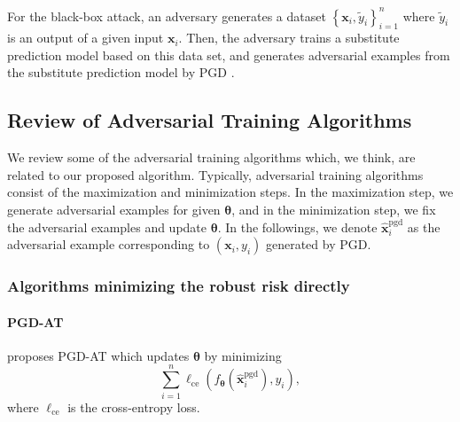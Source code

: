 \documentclass[nohyperref]{article}
\theoremstyle{plain}
\theoremstyle{definition}
\theoremstyle{remark}
\begin{document}


For the black-box attack, an adversary generates a dataset $\left\{\bm{x}_i, \tilde{y}_i \right\}_{i=1}^n$ where $\tilde{y}_i$ is an output of a given input $\bm{x}_i$.
Then, the adversary trains a substitute prediction model based on this data set, and generates adversarial examples from the substitute prediction model by PGD \citep{papernot2017practical}.

\subsection{Review of Adversarial Training Algorithms}
We review some of the adversarial training algorithms which, we think, are related to our proposed algorithm. Typically, adversarial training algorithms consist of the maximization and minimization steps. In the maximization step, we generate adversarial examples for given $\bm{\theta}$, and in the minimization step, we fix the adversarial examples and update $\bm{\theta}$. In the followings, we denote $\bm{\widehat{x}}^{\text{pgd}}_{i}$ as the adversarial example corresponding to
$(\bm{x}_i, y_i)$ generated by PGD.


\subsubsection{Algorithms minimizing the robust risk directly}

\paragraph{PGD-AT} \citet{madry2018towards} proposes PGD-AT which 
updates $\bm{\theta}$ by minimizing
\begin{equation*}
    \sum\limits_{i=1}^n \ell_{\text{ce}}(f_{\bm{\theta}}(\bm{\widehat{x}}^{\text{pgd}}_{i}), y_i), 
\end{equation*}
where $\ell_{\text{ce}}$ is the cross-entropy loss.
\end{document}
